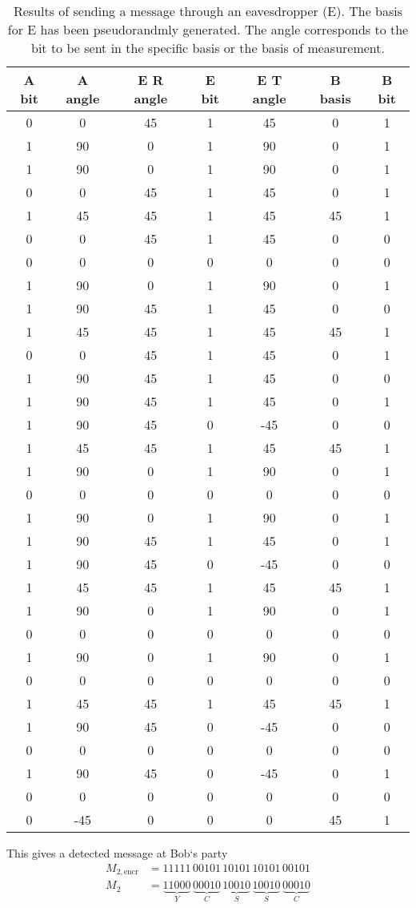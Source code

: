 \begin{table}
  \centering
  \caption{Results of sending a message through an eavesdropper (E). The basis for E has been
  pseudorandmly generated. The angle corresponds to the bit to be sent in the specific basis or the
basis of measurement.}
  \label{tab:res:sending-sequence}
  \begin{tabular}{c | c | c | c | c | c | c}
    A bit &
    A angle &
    E R angle &
    E bit &
    E T angle &
    B basis &
    B bit \\
    \hline
    0&0&45&1&45&0&1 \\
    1&90&0&1&90&0&1 \\
    1&90&0&1&90&0&1 \\
    0&0&45&1&45&0&1 \\
    1&45&45&1&45&45&1 \\
    0&0&45&1&45&0&0 \\
    0&0&0&0&0&0&0 \\
    1&90&0&1&90&0&1 \\
    1&90&45&1&45&0&0  \\
    1&45&45&1&45&45&1 \\
    0&0&45&1&45&0&1 \\
    1&90&45&1&45&0&0  \\
    1&90&45&1&45&0&1  \\
    1&90&45&0&-45&0&0 \\
    1&45&45&1&45&45&1 \\
    1&90&0&1&90&0&1 \\
    0&0&0&0&0&0&0 \\
    1&90&0&1&90&0&1 \\
    1&90&45&1&45&0&1  \\
    1&90&45&0&-45&0&0 \\
    1&45&45&1&45&45&1 \\
    1&90&0&1&90&0&1 \\
    0&0&0&0&0&0&0 \\
    1&90&0&1&90&0&1 \\
    0&0&0&0&0&0&0 \\
    1&45&45&1&45&45&1 \\
    1&90&45&0&-45&0&0 \\
    0&0&0&0&0&0&0 \\
    1&90&45&0&-45&0&1 \\
    0&0&0&0&0&0&0 \\
    0&-45&0&0&0&45&1  \\
  \end{tabular}
\end{table}

This gives a detected message at Bob`s party
\begin{align}
  M_{2, \text{encr}} &= 11111 \, 
                        00101 \,
                        10101 \,
                        10101 \,
                        00101 \\
  M_{2} &= \underbrace{11000}_{Y} \, 
           \underbrace{00010}_{C} \,
           \underbrace{10010}_{S} \,
           \underbrace{10010}_{S} \,
           \underbrace{00010}_{C}
  \label{eqn:final_message}
\end{align}
